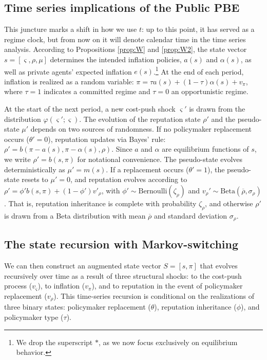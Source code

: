 \documentclass[12pt,letter,leqno]{article}
\theoremstyle{asn}
\theoremstyle{lem}
\theoremstyle{slem}
\theoremstyle{prop}
\theoremstyle{appprop}
\theoremstyle{rem}
\theoremstyle{defn}
\begin{document}
\subsection{Time series implications of the Public PBE}\label{sec:tsrecursion}
This juncture marks a shift in how we use $t$: up to this point, it has served as a regime clock, but from now on it will denote calendar time in the time series analysis. According to Propositions \ref{prop:W} and \ref{prop:W2}, the state vector $s = [\varsigma, \rho, \mu]$ determines the intended inflation policies, $a(s)$ and $\alpha(s)$, as well as private agents’ expected inflation $e(s)$.\footnote{We drop the superscript $*$, as we now focus exclusively on equilibrium behavior.} At the end of each period, inflation is realized as a random variable: $\pi = \tau a(s) + (1 - \tau) \alpha(s) + v_{\pi}$, where $\tau = 1$ indicates a committed regime and $\tau = 0$ an opportunistic regime.

At the start of the next period, a new cost-push shock $\varsigma'$ is drawn from the distribution $\varphi(\varsigma'; \varsigma)$. The evolution of the reputation state $\rho'$ and the pseudo-state $\mu'$ depends on two sources of randomness. If no policymaker replacement occurs ($\theta' = 0$), reputation updates via Bayes’ rule: $\rho' = b(\pi-a(s), \pi-\alpha(s), \rho)$. Since $a$ and $\alpha$ are equilibrium functions of $s$, we write $\rho' = b(s, \pi)$ for notational convenience. The pseudo-state evolves deterministically as $\mu' = m(s)$. If a replacement occurs ($\theta' = 1$), the pseudo-state resets to $\mu' = 0$, and reputation evolves according to $\rho' = \phi' b(s, \pi) + (1 - \phi') v'_\rho$, with $\phi' \sim \text{Bernoulli}(\zeta_\rho)$ and $v_{\rho}' \sim \text{Beta}(\overline{\rho},\sigma_{\rho})$. That is, reputation inheritance is complete with probability $\zeta_\rho$, and otherwise $\rho'$ is drawn from a Beta distribution with mean $\overline{\rho}$ and standard deviation $\sigma_\rho$. 

\subsection{The state recursion with Markov-switching}\label{sec:stateextraction}

We can then construct an augmented state vector $S = [s, \pi]$ that evolves recursively over time as a result of three structural shocks: to the cost-push process ($v_\varsigma$), to inflation ($v_\pi$), and to reputation in the event of policymaker replacement ($v_\rho$). This time-series recursion is conditional on the realizations of three binary states: policymaker replacement ($\theta$), reputation inheritance ($\phi$), and policymaker type ($\tau$). 
\end{document}

